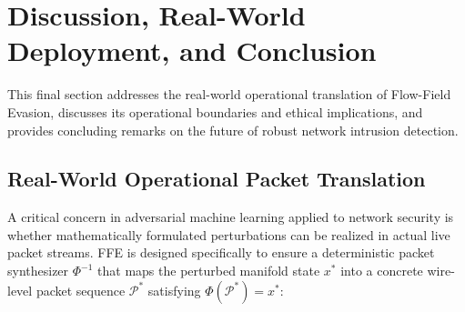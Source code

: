 \documentclass[pdflatex,sn-mathphys-num]{sn-jnl}
\theoremstyle{thmstyleone}
\theoremstyle{thmstyletwo}
\theoremstyle{thmstylethree}
\begin{document}




\FloatBarrier

\section{Discussion, Real-World Deployment, and Conclusion}
\label{sec:conclusion}

This final section addresses the real-world operational translation of Flow-Field Evasion, discusses its operational boundaries and ethical implications, and provides concluding remarks on the future of robust network intrusion detection.

\subsection{Real-World Operational Packet Translation}
A critical concern in adversarial machine learning applied to network security is whether mathematically formulated perturbations can be realized in actual live packet streams. FFE is designed specifically to ensure a deterministic packet synthesizer $\Phi^{-1}$ that maps the perturbed manifold state $x^*$ into a concrete wire-level packet sequence $\mathcal{P}^*$ satisfying $\Phi(\mathcal{P}^*) = x^*$:
\end{document}
